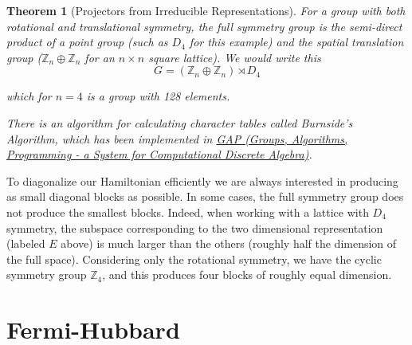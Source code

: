 \documentclass{article}
\newtheorem{theorem}{Theorem}[section]
\theoremstyle{definition}
\begin{document}
\begin{theorem}[Projectors from Irreducible Representations]
For a group with both rotational and translational symmetry, the full symmetry group is the semi-direct product of a point group (such as $D_4$ for this example) and the spatial translation group ($\mathbb{Z}_n \oplus \mathbb{Z}_n$ for an $n \times n$ square lattice). We would write this 
\begin{equation}
G = (\mathbb{Z}_n \oplus \mathbb{Z}_n) \rtimes D_4
\end{equation}

which for $n=4$ is a group with 128 elements.

There is an algorithm for calculating character tables called \emph{Burnside's Algorithm}, which has been implemented in \href{https://www.gap-system.org/}{GAP (Groups, Algorithms, Programming - a System for Computational Discrete Algebra)}.

\end{theorem}

To diagonalize our Hamiltonian efficiently we are always interested in producing as small diagonal blocks as possible. In some cases, the full symmetry group does not produce the smallest blocks. Indeed, when working with a lattice with $D_4$ symmetry, the subspace corresponding to the two dimensional representation (labeled $E$ above) is much larger than the others (roughly half the dimension of the full space). Considering only the rotational symmetry, we have the cyclic symmetry group $\mathbb{Z}_4$, and this produces four blocks of roughly equal dimension.

\section{Fermi-Hubbard}
\end{document}
